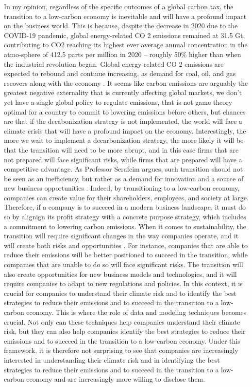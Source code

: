 In my opinion, regardless of the specific outcomes of a global carbon tax, the transition to a low-carbon economy is inevitable and will have a profound impact on the business world. This is because, despite the decrease in 2020 due to the COVID-19 pandemic, global energy-related CO 2 emissions remained at 31.5 Gt, contributing to CO2 reaching its highest ever average annual concentration in the atmo-sphere of 412.5 parts per million in 2020 – roughly 50\% higher than when the industrial revolution began. Global energy-related CO 2 emissions are expected to rebound and continue increasing, as demand for coal, oil, and gas recovers along with the economy \cite{BHATT2023100095}. It seems like carbon emissions are arguably the greatest negative externality that is currently affecting global markets, we don't yet have a single global policy to regulate emissions, that is not game theory optimal for a country to commit to lowering emissions before others, but chances are that if the decabonization strategy is not implemented, the world will face a climate crisis that will have a profound impact on the economy. Interestingly, the more we wait to implement a decarbonization strategy, the more likely it will be that the transition will need to be more abrupt, and in this case firms that are not prepared will face significant risks, while firms that are prepared will have a competitive advantage. As Professor Serafeim argues, such transition should not be seen as an inefficiency, but rather as a demand for innovation and a source of new business opportunities \cite{purpose+profit}. Indeed, by transitioning to a low-carbon economy, companies can create value for their shareholders, employees, and society at large. Therefore, if a company is to succeed in a modern business landscape, it must do so by alignign its profit strategy with a concrete purpose strategy, which includes a commitment to lowering carbon emissions. When it comes to sustainability, the transition will require significant changes in the way companies operate, and it will create both risks and opportunities \cite{purpose+profit}. For instance, companies that are able to reduce their emissions will be better positioned to succeed in the transition, while companies that are unable to do so will face significant risks. The transition will also create opportunities for new business models and technologies, and it will require companies to adapt to new regulations and policies. In this context, it is crucial for companies to understand their climate risk and to identify the best strategies to reduce their emissions and to succeed in the transition to a low-carbon economy. This is where the role of data and modeling techniques becomes crucial. Not only can these techniques help companies understand their climate risk, but they can also help companies identify the best strategies to reduce their emissions and to succeed in the transition to a low-carbon economy. Under this framework, it is therefore not surprising to see that companies are increasingly interested in understanding their climate risk and in identifying the best strategies to reduce their emissions and to succeed in the transition to a low-carbon economy and are increasingly more willing to disclose them.


